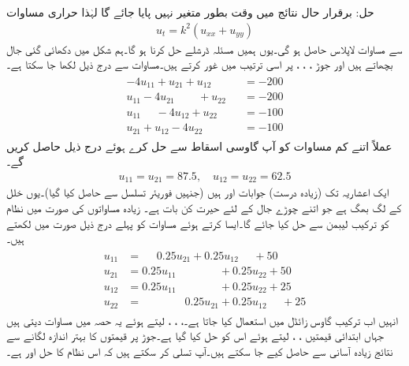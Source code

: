 حل:\quad
برقرار حال نتائج میں وقت بطور متغیر نہیں پایا جائے گا لہٰذا حراری مساوات
\begin{align*}
u_t=k^2(u_{xx}+u_{yy})
\end{align*}
سے مساوات لاپلاس حاصل ہو گی۔یوں ہمیں مسئلہ ڈرشلے حل کرنا ہو گا۔ہم شکل میں دکھائی گئی جال بچھاتے ہیں اور جوڑ ، ، ،  پر اسی ترتیب میں غور کرتے ہیں۔مساوات  سے درج ذیل لکھا جا سکتا ہے۔
\begin{gather}
\begin{aligned}\label{مساوات_اعدادی_نظام_لیبمن_الف}
-4u_{11}+u_{21}+u_{12}\phantom{+u_{13}}&=-200\\
u_{11}-4u_{21}\phantom{+u_{23}}+u_{22}&=-200\\
u_{11}\phantom{u_{22}}-4u_{12}+u_{22}&=-100\\
u_{21}+u_{12}-4u_{22}&=-100
\end{aligned}
\end{gather}
عملاً اتنے کم مساوات کو آپ گاوسی اسقاط سے حل کرے ہوئے درج ذیل حاصل کریں گے۔
\begin{align*}
u_{11}=u_{21}=87.5,\quad u_{12}=u_{22}=62.5
\end{align*}
ایک اعشاریہ  تک (زیادہ درست) جوابات  اور  ہیں (جنہیں فوریئر تسلسل سے حاصل کیا گیا)۔یوں خلل  کے لگ بھگ ہے جو اتنے چوڑے جال کے لئے حیرت کن بات ہے۔ زیادہ مساواتوں کی صورت میں نظام کو ترکیب لیبمن سے حل کیا جائے گا۔ایسا کرتے ہوئے مساوات  کو پہلے درج ذیل صورت میں لکھتے ہیں۔
\begin{gather}
\begin{aligned}\label{مساوات_اعدادی_نظام_لیبمن_ب}
u_{11}&=\phantom{u_{23}}0.25u_{21}+0.25u_{12}\phantom{u_{32}}+50\\
u_{21}&=0.25u_{11}\phantom{u_{23}+u_{32}}+0.25u_{22}+50\\
u_{12}&=0.25u_{11}\phantom{u_{23}+u_{21}}+0.25u_{22}+25\\
u_{22}&=\phantom{u_{12}+u_{23}}0.25u_{21}+0.25u_{12}\phantom{u_{21}}+25
\end{aligned}
\end{gather} 
انہیں اب ترکیب گاوس زائڈل میں استعمال کیا جاتا ہے۔، ، ،  لیتے ہوئے یہ  حصہ   میں مساوات دیتی ہیں جہاں ابتدائی قیمتیں ، ،  لیتے ہوئے اس کو  حل کیا گیا ہے۔جوڑ پر قیمتوں کا بہتر اندازہ لگانے سے نتائج زیادہ آسانی سے حاصل کیے جا سکتے ہیں۔آپ تسلی کر سکتے ہیں کہ اس نظام کا حل  اور  ہے۔

